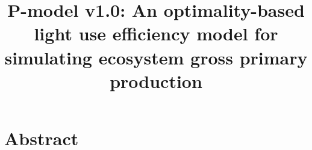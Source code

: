 \documentclass{myreport}
\begin{document}
\pagestyle{headings}

% 


\title{P-model v1.0: An optimality-based light use efficiency model for simulating ecosystem gross primary production}

\maketitle

\tableofcontents

\section*{Abstract}
\end{document}
